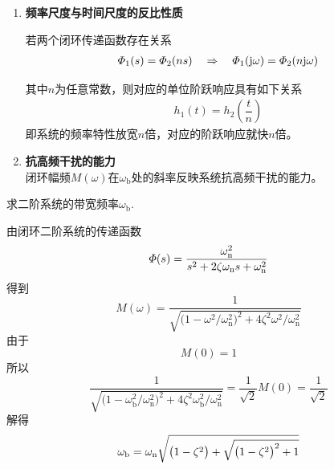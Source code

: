 \begin{enumerate}[1. ]
		\item \textbf{频率尺度与时间尺度的反比性质}
				
			\theorem[相似定理]
			若两个闭环传递函数存在关系
			\vspace*{-1em}
			\begin{align}
				\varPhi_1(s) = \varPhi_2(n s) \quad \Rightarrow \quad \varPhi_1(\text{j} \omega) = \varPhi_2(n \text{j} \omega)
			\end{align}
			\vspace*{-3em}
			
			其中$n$为任意常数，则对应的单位阶跃响应具有如下关系
			\begin{align}
				h_1(t) = h_2 \left(\dfrac{t}{n}\right)
			\end{align}
			即系统的频率特性放宽$n$倍，对应的阶跃响应就快$n$倍。
				
				
				
		\item \textbf{抗高频干扰的能力}	\\
		\hspace*{2em} 闭环幅频$M(\omega)$在$\omega_{\text{b}}$处的斜率反映系统抗高频干扰的能力。
\end{enumerate}
\examples 求二阶系统的带宽频率$\omega_{\text{b}}$.

\solve 由闭环二阶系统的传递函数
\[
\varPhi(s) =  \dfrac{\omega_{\rm{n}}^2}{s^2 + 2 \zeta \omega_{\rm{n}} s + \omega_{\rm{n}}^2}
\]
得到
\[
M(\omega) = \dfrac{1}{\sqrt{ \big(1 - \omega^2 / \omega_{\text{n}}^2\big)^2+ 4 \zeta^2 \omega^2 / \omega_{\text{n}}^2}} 
\]
由于
\[
	M(0) = 1
\]
所以
\[
\dfrac{1}{\sqrt{ \big(1 - \omega_{\text{b}}^2 / \omega_{\text{n}}^2\big)^2+ 4 \zeta^2 \omega_{\text{b}}^2 / \omega_{\text{n}}^2}}  = \dfrac{1}{\sqrt{2}}M(0) = \dfrac{1}{\sqrt{2}}
\]
解得
\begin{align}
	\omega_{\text{b}} = \omega_{{\rm{n}}}\sqrt{\big(1 - \zeta^2\big) + \sqrt{\big(1 - \zeta^2\big)^2 + 1}}
\end{align}

